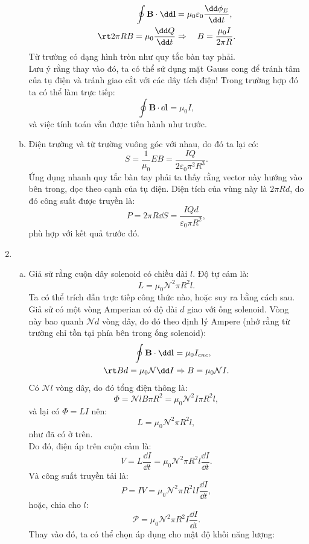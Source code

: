 \begin{loigiai}
\begin{enumerate}[1)]
\begin{enumerate}[a)]
     $$
\begin{aligned}
\oint \mathbf{B} \cdot \dd \mathbf{l} &=\mu_{0} \varepsilon_0 \dfrac{\dd \phi_E}{\dd t}, \\
\rt 2 \pi R B=\mu_{0} \dfrac{\dd Q}{\dd t} & \Rightarrow \quad B=\dfrac{\mu_0 I}{2\pi R}.
\end{aligned}
$$
Từ trường có dạng hình tròn như quy tắc bàn tay phải.\\
Lưu ý rằng thay vào đó, ta có thể sử dụng mặt Gauss cong để tránh tâm của tụ điện và tránh giao cắt với các dây tích điện! Trong trường hợp đó ta có thể làm trực tiếp:
$$\oint \mathbf{B} \cdot \dd \mathbf{l}=\mu_0 I,$$
và việc tính toán vẫn được tiến hành như trước.
\item Điện trường và từ trường vuông góc với nhau, do đó ta lại có:
$$S=\dfrac{1}{\mu_0}EB=\dfrac{IQ}{2\varepsilon_0\pi ^2R^3}.$$
Ứng dụng nhanh quy tắc bàn tay phải ta thấy rằng vector này hướng vào bên trong, dọc theo cạnh của tụ điện. Diện tích của vùng này là $2\pi R d$, do đó công suất được truyền là:
$$P=2\pi R\dd S=\dfrac{IQd}{\varepsilon_0\pi R^2},$$
phù hợp với kết quả trước đó.
\end{enumerate}
\item 
\begin{enumerate}[a)]
    \item Giả sử rằng cuộn dây solenoid có chiều dài $l$. Độ tự cảm là:
    $$L=\mu_0\mathcal{N}^2\pi R^2 l.$$
    Ta có thể trích dẫn trực tiếp công thức nào, hoặc suy ra bằng cách sau. Giả sử có một vòng Amperian có độ dài $d$ giao với ống solenoid. Vòng này bao quanh $\mathcal{N}d$ vòng dây, do đó theo định lý Ampere (nhớ rằng từ trường chỉ tồn tại phía bên trong ống solenoid):
    $$
\begin{aligned}
\oint \mathbf{B} \cdot \dd \mathbf{l} &=\mu_{0} I_{c n c}, \\
\rt B d=\mu_{0} \mathcal{N} \dd I & \Rightarrow B=\mu_{0} \mathcal{N} I.
\end{aligned}
$$
Có $\mathcal{N}l$ vòng dây, do đó tổng điện thông là:
$$\Phi =\mathcal{N}l B\pi R^2=\mu_0\mathcal{N}^2I\pi R^2 l,$$
và lại có $\Phi=LI$ nên:
$$L=\mu_0\mathcal{N}^2\pi R^2l,$$
như đã có ở trên.\\
Do đó, điện áp trên cuộn cảm là:
$$V=L\dfrac{\dd I}{\dd t}=\mu_0\mathcal{N}^2\pi R^2l\dfrac{\dd I}{\dd t}.$$
Và công suất truyền tải là:
$$P=IV=\mu_0\mathcal{N}^2\pi R^2l I\dfrac{\dd I}{\dd t},$$
hoặc, chia cho $l$:
$$\mathcal{P}=\mu_0\mathcal{N}^2\pi R^2I\dfrac{\dd I}{\dd t}.$$
Thay vào đó, ta có thể chọn áp dụng cho mật độ khối năng lượng:

\end{enumerate}
\end{enumerate}
\end{loigiai}
